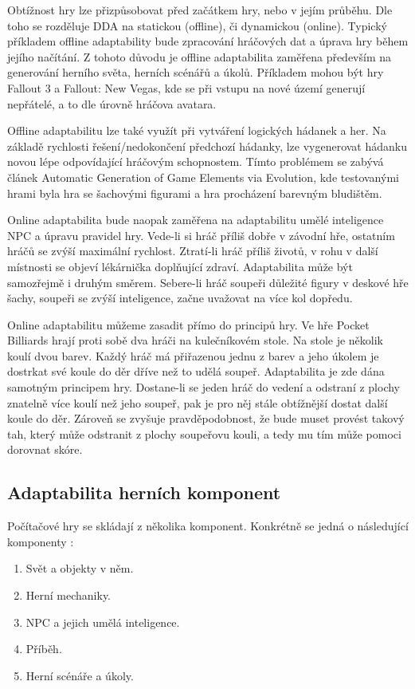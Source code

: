 Obtížnost hry lze přizpůsobovat před začátkem hry, nebo v jejím průběhu. Dle toho se rozděluje DDA na statickou (offline), či dynamickou (online). Typický příkladem offline adaptability bude zpracování hráčových dat a úprava hry během jejího načítání. Z tohoto důvodu je offline adaptabilita zaměřena především na generování herního světa, herních scénářů a úkolů\cite{16Survey}. Příkladem mohou být hry Fallout 3 a Fallout: New Vegas\cite{fallout}, kde se při vstupu na nové území generují nepřátelé, a to dle úrovně hráčova avatara. 

Offline adaptabilitu lze také využít při vytváření logických hádanek a her. Na základě rychlosti řešení/nedokončení předchozí hádanky, lze vygenerovat hádanku novou lépe odpovídající hráčovým schopnostem. Tímto problémem se zabývá článek Automatic Generation of Game Elements via Evolution\cite{17Evol}, kde testovanými hrami byla hra se šachovými figurami a hra procházení barevným bludištěm.

Online adaptabilita bude naopak zaměřena na adaptabilitu umělé inteligence NPC a úpravu pravidel hry. Vede-li si hráč příliš dobře v závodní hře, ostatním hráčů se zvýší maximální rychlost. Ztratí-li hráč příliš životů, v rohu v další místnosti se objeví lékárnička doplňující zdraví. Adaptabilita může být samozřejmě i druhým směrem. Sebere-li hráč soupeři důležité figury v deskové hře šachy, soupeři se zvýší inteligence, začne uvažovat na více kol dopředu. 

Online adaptabilitu můžeme zasadit přímo do principů hry. Ve hře Pocket Billiards hrají proti sobě dva hráči na kulečníkovém stole. Na stole je několik koulí dvou barev. Každý hráč má přiřazenou jednu z barev a jeho úkolem je dostrkat své koule do děr dříve než to udělá soupeř. Adaptabilita je zde dána samotným principem hry. Dostane-li se jeden hráč do vedení a odstraní z plochy znatelně více koulí než jeho soupeř, pak je pro něj stále obtížnější dostat další koule do děr. Zároveň se zvyšuje pravděpodobnost, že bude muset provést takový tah, který může odstranit z plochy soupeřovu kouli, a tedy mu tím může pomoci dorovnat skóre\cite{5}.

\subsection{Adaptabilita herních komponent}

Počítačové hry se skládají z několika komponent. Konkrétně se jedná o následující komponenty \cite{16Survey}: 

\begin{enumerate}
	\item Svět a objekty v něm.
	\item Herní mechaniky.
	\item NPC a jejich umělá inteligence.
	\item Příběh.
	\item Herní scénáře a úkoly.
\end{enumerate}

